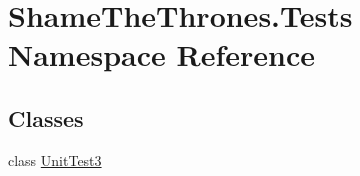 \hypertarget{namespace_shame_the_thrones_1_1_tests}{}\section{Shame\+The\+Thrones.\+Tests Namespace Reference}
\label{namespace_shame_the_thrones_1_1_tests}
\subsection*{Classes}
\begin{DoxyCompactItemize}
\item 
class \hyperlink{class_shame_the_thrones_1_1_tests_1_1_unit_test3}{Unit\+Test3}
\end{DoxyCompactItemize}
